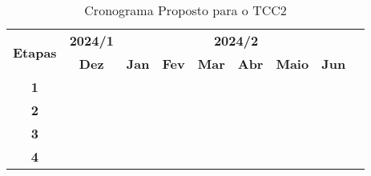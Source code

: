   \begin{table}[htbp]
    \centering
    \begin{tabular}{|c|c|c|c|c|c|c|c|c|}
      \hline
      \multirow{2}{*}{\textbf{\small{Etapas}}} & \textbf{\small{2024/1}} & \multicolumn{6}{c|}{\textbf{\small{2024/2}}} \\
      \cline{2-8}
      & \textbf{Dez} & \textbf{Jan} & \textbf{Fev} & \textbf{Mar} & \textbf{Abr} & \textbf{Maio} & \textbf{Jun} \\
      \hline
      \textbf{\small{1}}  & \cellcolor{gray} & \cellcolor{gray} &  &  &  &  & \\
      \hline
      \textbf{\small{2}}  &  & \cellcolor{gray} & \cellcolor{gray} &  &  &  & \\
      \hline
      \textbf{\small{3}}  &  & \cellcolor{gray} & \cellcolor{gray} & \cellcolor{gray} &  &  & \\
      \hline
      \textbf{\small{4}}  &  &  & \cellcolor{gray} & \cellcolor{gray} & \cellcolor{gray} & \cellcolor{gray} & \cellcolor{gray}\\
      \hline
    \end{tabular}
    \caption{Cronograma Proposto para o TCC2}
  \end{table}
